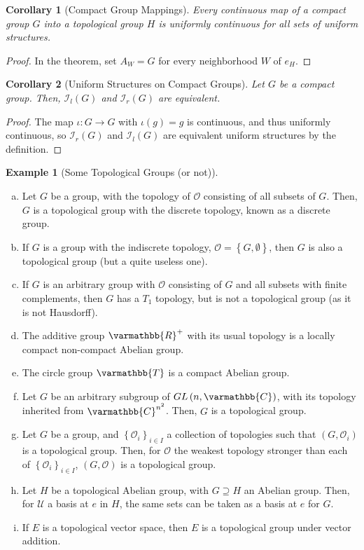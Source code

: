 \documentclass[10pt]{extarticle}
\newcommand{\R}{\mathbb{R}}
\newcommand{\C}{\mathbb{C}}
\newcommand{\mco}{\mathcal{O}} %
\newcommand{\set}[1]{\left\{#1\right\}}
\theoremstyle{plain}
\newtheorem*{corollary}{Corollary}
\theoremstyle{definition}
\newtheorem*{example}{Example}
\theoremstyle{note}
\renewcommand*{\mathbb}[1]{\varmathbb{#1}}
\begin{document}
\begin{corollary}[Compact Group Mappings]
  Every continuous map of a compact group $G$ into a topological group $H$ is uniformly continuous for all sets of uniform structures.
\end{corollary}
\begin{proof}
  In the theorem, set $A_W = G$ for every neighborhood $W$ of $e_H$.
\end{proof}
\begin{corollary}[Uniform Structures on Compact Groups]
  Let $G$ be a compact group. Then, $\mathcal{I}_l(G)$ and $\mathcal{I}_r(G)$ are equivalent.
\end{corollary}
\begin{proof}
  The map $\iota: G\rightarrow G$ with $\iota(g) = g$ is continuous, and thus uniformly continuous, so $\mathcal{I}_r(G)$ and $\mathcal{I}_l(G)$ are equivalent uniform structures by the definition.
\end{proof}
\begin{example}[Some Topological Groups (or not)]
  \begin{enumerate}[(a)]
    \item Let $G$ be a group, with the topology of $\mco$ consisting of all subsets of $G$. Then, $G$ is a topological group with the discrete topology, known as a discrete group.
    \item If $G$ is a group with the indiscrete topology, $\mco = \set{G,\emptyset}$, then $G$ is also a topological group (but a quite useless one).
    \item If $G$ is an arbitrary group with $\mco$ consisting of $G$ and all subsets with finite complements, then $G$ has a $T_1$ topology, but is not a topological group (as it is not Hausdorff).
    \item The additive group $\R^{+}$ with its usual topology is a locally compact non-compact Abelian group.
    \item The circle group $\mathbb{T}$ is a compact Abelian group.
    \item Let $G$ be an arbitrary subgroup of $GL\left(n,\C\right)$, with its topology inherited from $\C^{n^2}$. Then, $G$ is a topological group.
    \item Let $G$ be a group, and $\set{\mco_i}_{i\in I}$ a collection of topologies such that $\left(G,\mco_i\right)$ is a topological group. Then, for $\mco$ the weakest topology stronger than each of $\set{\mco_i}_{i\in I}$, $\left(G,\mco\right)$ is a topological group.
    \item Let $H$ be a topological Abelian group, with $G\supseteq H$ an Abelian group. Then, for $\mathcal{U}$ a basis at $e$ in $H$, the same sets can be taken as a basis at $e$ for $G$.
    \item If $E$ is a topological vector space, then $E$ is a topological group under vector addition.
  \end{enumerate}
\end{example}
\end{document}
